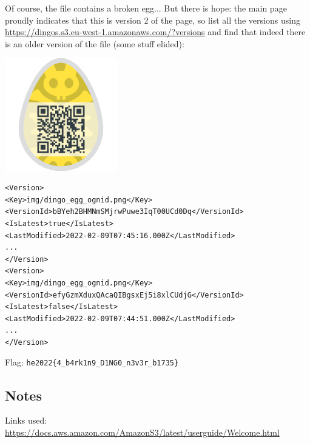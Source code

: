 Of course, the file contains a broken egg...  But there is hope: the main page proudly indicates that this is version 2 of the page, so list all the versions using \url{https://dingos.s3.eu-west-1.amazonaws.com/?versions} and find that indeed there is an older version of the file (some stuff elided):

\begin{marginfigure}
	\includegraphics[width=49mm]{level6/dingo_egg_ognid_old_version.png}
\end{marginfigure}

\begin{verbatim}
<Version>
<Key>img/dingo_egg_ognid.png</Key>
<VersionId>bBYeh2BHMNmSMjrwPuwe3IqT00UCd0Dq</VersionId>
<IsLatest>true</IsLatest>
<LastModified>2022-02-09T07:45:16.000Z</LastModified>
...
</Version>
<Version>
<Key>img/dingo_egg_ognid.png</Key>
<VersionId>efyGzmXduxQAcaQIBgsxEj5i8xlCUdjG</VersionId>
<IsLatest>false</IsLatest>
<LastModified>2022-02-09T07:44:51.000Z</LastModified>
...
</Version>
\end{verbatim}

Flag: \verb+he2022{4_b4rk1n9_D1NG0_n3v3r_b1735}+	

\subsection{Notes}
Links used:
\href{Amazon S3 User Guide}{https://docs.aws.amazon.com/AmazonS3/latest/userguide/Welcome.html}








